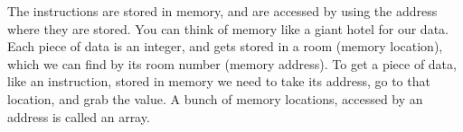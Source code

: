 The instructions are stored in memory, and are accessed by using the address where they are stored.  You can think of memory like a giant hotel for our data.  Each piece of data is an integer, and gets stored in a room (memory location), which we can find by its room number (memory address).  To get a piece of data, like an instruction, stored in memory we need to take its address, go to that location, and grab the value.  A bunch of memory locations, accessed by an address is called an array. 